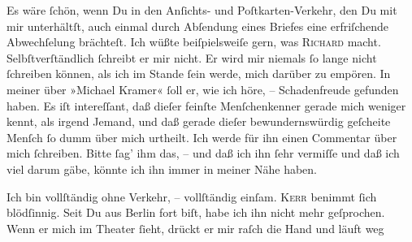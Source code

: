 \pstart
           Es wäre ſchön, wenn Du in den \strikeout{\textcolor{gray}{B}} Anſichts- und Poſtkarten-Verkehr, den Du mit mir unterhältſt, auch einmal
               durch Abſendung eines Briefes eine erfriſchende Abwechſelung brächteſt. Ich wüßte
               beiſpielsweiſe gern, was \textsc{Richard} macht. Selbſtverſtändlich ſchreibt er mir nicht. Er wird mir niemals ſo lange
               nicht ſchreiben können, als {\pb}ich im Stande ſein
               werde, mich darüber zu empören. In meiner \label{K_L03055-4v}\label{K_L03055-4} über »Michael Kramer« ſoll er, wie ich höre, –
               Schadenfreude gefunden haben. Es iſt intereſſant, daß dieſer feinſte \strikeout{\textcolor{gray}{×}\-\textcolor{gray}{×}\-\textcolor{gray}{×}\-\textcolor{gray}{×}}{ }Menſchenkenner gerade mich
               weniger kennt, als irgend Jemand, und daß gerade dieſer bewundernswürdig geſcheite
                  Menſch ſo dumm über mich
               urtheilt. Ich werde für ihn einen Commentar über mich ſchreiben. Bitte ſag’ ihm das,
               – und daß ich ihn ſehr vermiſſe und daß ich viel darum gäbe, könnte ich ihn immer in
               meiner Nähe haben.\pend
           
\pstart
           {\pb}Ich bin vollſtändig ohne Verkehr, – vollſtändig
               einſam. \textsc{Kerr} benimmt ſich blödſinnig. Seit Du aus Berlin
               fort biſt, habe ich ihn nicht mehr geſprochen. Wenn er mich im Theater ſieht, drückt
               er mir raſch die Hand und läuft weg{\dotssix}\pend
           
